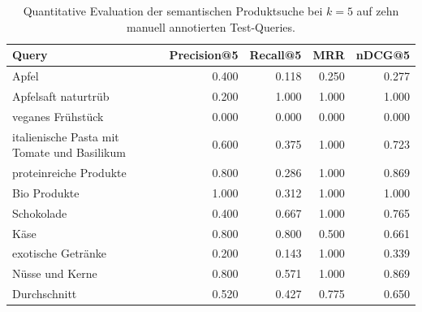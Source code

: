 \begin{table}[htbp]
\centering
\small
\begin{tabular}{lrrrr}
\toprule
Query & Precision@5 & Recall@5 & MRR & nDCG@5 \\
\midrule
Apfel & 0.400 & 0.118 & 0.250 & 0.277 \\
Apfelsaft naturtrüb & 0.200 & 1.000 & 1.000 & 1.000 \\
veganes Frühstück & 0.000 & 0.000 & 0.000 & 0.000 \\
italienische Pasta mit Tomate und Basilikum & 0.600 & 0.375 & 1.000 & 0.723 \\
proteinreiche Produkte & 0.800 & 0.286 & 1.000 & 0.869 \\
Bio Produkte & 1.000 & 0.312 & 1.000 & 1.000 \\
Schokolade & 0.400 & 0.667 & 1.000 & 0.765 \\
Käse & 0.800 & 0.800 & 0.500 & 0.661 \\
exotische Getränke & 0.200 & 0.143 & 1.000 & 0.339 \\
Nüsse und Kerne & 0.800 & 0.571 & 1.000 & 0.869 \\
\midrule
Durchschnitt & 0.520 & 0.427 & 0.775 & 0.650 \\
\bottomrule
\end{tabular}
\caption{Quantitative Evaluation der semantischen Produktsuche bei $k=5$ auf zehn manuell annotierten Test-Queries.}
\label{tab:search-evaluation}
\end{table}
